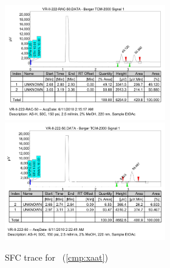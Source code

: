 \begin{figure}[h]
\centering
\includegraphics[width=2.75in]{chp_asymmetric/images/sfc/xaat-rac.png}
\includegraphics[width=2.75in]{chp_asymmetric/images/sfc/xaat.png}
\caption{SFC trace for \CMPxaat~(\ref{cmp:xaat})}
\vspace{-10pt}
\end{figure}

